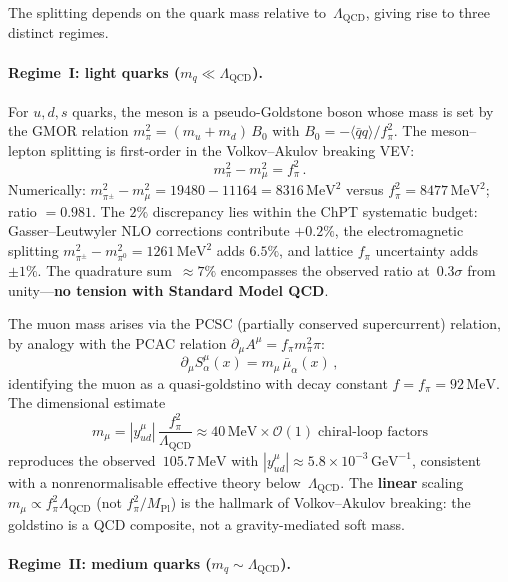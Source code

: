 \documentclass[aps,prd,twocolumn,showpacs,preprintnumbers,superscriptaddress]{revtex4-2}
\newcommand{\MeV}{\,\mathrm{MeV}}
\newcommand{\GeV}{\,\mathrm{GeV}}
\newcommand{\Lqcd}{\Lambda_{\mathrm{QCD}}}
\begin{document}
The splitting depends on the quark mass relative
to~$\Lqcd$, giving rise to three distinct regimes.

\paragraph{Regime~I: light quarks ($m_q \ll \Lqcd$).}

For $u, d, s$ quarks, the meson is a pseudo-Goldstone boson
whose mass is set by the GMOR relation
$m_\pi^2 = (m_u + m_d)\,B_0$ with
$B_0 = -\langle\bar q q\rangle/f_\pi^2$.
The meson--lepton splitting is first-order in the
Volkov--Akulov breaking VEV:
\begin{equation}
  m_\pi^2 - m_\mu^2 = f_\pi^2\,.
  \label{eq:regime1}
\end{equation}
Numerically:
$m_{\pi^\pm}^2 - m_\mu^2 = 19480 - 11164 = 8316\MeV^2$
versus $f_\pi^2 = 8477\MeV^2$; ratio $= 0.981$.
The $2\%$ discrepancy lies within the ChPT systematic budget:
Gasser--Leutwyler NLO corrections contribute $+0.2\%$,
the electromagnetic splitting
$m_{\pi^\pm}^2 - m_{\pi^0}^2 = 1261\MeV^2$ adds $6.5\%$,
and lattice $f_\pi$ uncertainty adds~$\pm 1\%$.
The quadrature sum~$\approx 7\%$ encompasses the observed
ratio at~$0.3\sigma$ from
unity---\textbf{no tension with Standard Model QCD}.

The muon mass arises via the PCSC
(partially conserved supercurrent) relation,
by analogy with the PCAC relation
$\partial_\mu A^\mu = f_\pi m_\pi^2 \pi$:
\begin{equation}
  \partial_\mu S^\mu_\alpha(x) = m_\mu\,\bar\mu_\alpha(x)\,,
  \label{eq:PCSC}
\end{equation}
identifying the muon as a quasi-goldstino with decay
constant $f = f_\pi = 92\MeV$.
The dimensional estimate
\begin{equation}
  m_\mu = |y^\mu_{ud}|\,\frac{f_\pi^2}{\Lqcd}
  \approx 40\MeV \times \mathcal{O}(1)\;\text{chiral-loop factors}
  \label{eq:muon}
\end{equation}
reproduces the observed~$105.7\MeV$ with $|y^\mu_{ud}| \approx
5.8 \times 10^{-3}\GeV^{-1}$, consistent with a
nonrenormalisable effective theory below~$\Lqcd$.
The \textbf{linear} scaling $m_\mu \propto f_\pi^2\Lqcd$
(not $f_\pi^2/M_{\mathrm{Pl}}$) is the hallmark of
Volkov--Akulov breaking: the goldstino is a QCD composite,
not a gravity-mediated soft mass.

\paragraph{Regime~II: medium quarks ($m_q \sim \Lqcd$).}
\end{document}
